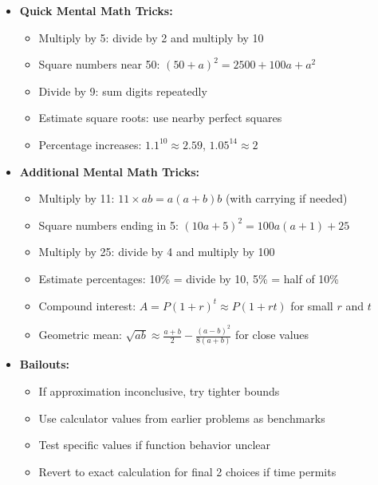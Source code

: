 \documentclass[12pt]{article}
\begin{document}
\begin{itemize}
    \item \textbf{Quick Mental Math Tricks:}
    \begin{itemize}
        \item Multiply by 5: divide by 2 and multiply by 10
        \item Square numbers near 50: $(50+a)^2 = 2500 + 100a + a^2$
        \item Divide by 9: sum digits repeatedly
        \item Estimate square roots: use nearby perfect squares
        \item Percentage increases: $1.1^{10} \approx 2.59$, $1.05^{14} \approx 2$
    \end{itemize}
    
    \item \textbf{Additional Mental Math Tricks:}
    \begin{itemize}
        \item Multiply by 11: $11 \times ab = a(a+b)b$ (with carrying if needed)
        \item Square numbers ending in 5: $(10a+5)^2 = 100a(a+1) + 25$
        \item Multiply by 25: divide by 4 and multiply by 100
        \item Estimate percentages: 10\% = divide by 10, 5\% = half of 10\%
        \item Compound interest: $A = P(1+r)^t \approx P(1+rt)$ for small $r$ and $t$
        \item Geometric mean: $\sqrt{ab} \approx \frac{a+b}{2} - \frac{(a-b)^2}{8(a+b)}$ for close values
    \end{itemize}
    
    \item \textbf{Bailouts:} 
    \begin{itemize}
        \item If approximation inconclusive, try tighter bounds
        \item Use calculator values from earlier problems as benchmarks
        \item Test specific values if function behavior unclear
        \item Revert to exact calculation for final 2 choices if time permits
    \end{itemize}
    

\end{itemize}
\end{document}
